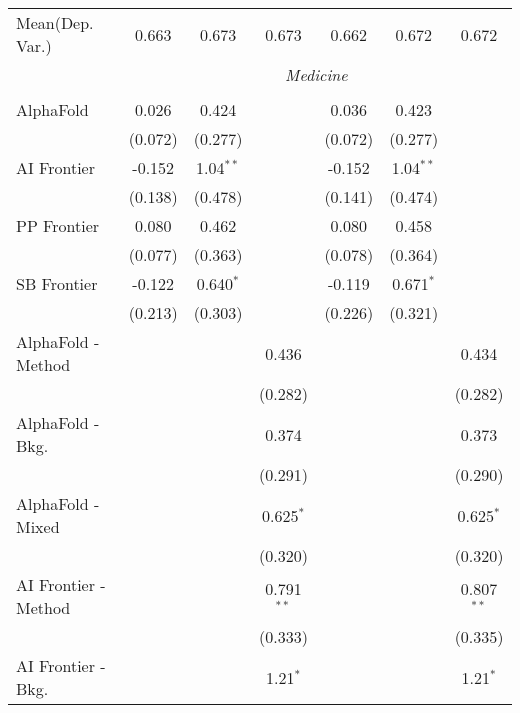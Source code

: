 \begin{tabular}{lcccccc}
Mean(Dep. Var.) & 0.663 & 0.673 & 0.673 & 0.662 & 0.672 & 0.672 \\
 & \multicolumn{6}{c}{\textit{Medicine}} \\ \\
   AlphaFold            & 0.026   & 0.424       &              & 0.036   & 0.423       &   \\   
                        & (0.072) & (0.277)     &              & (0.072) & (0.277)     &   \\   
   AI Frontier          & -0.152  & 1.04$^{**}$ &              & -0.152  & 1.04$^{**}$ &   \\   
                        & (0.138) & (0.478)     &              & (0.141) & (0.474)     &   \\   
   PP Frontier          & 0.080   & 0.462       &              & 0.080   & 0.458       &   \\   
                        & (0.077) & (0.363)     &              & (0.078) & (0.364)     &   \\   
   SB Frontier          & -0.122  & 0.640$^{*}$ &              & -0.119  & 0.671$^{*}$ &   \\   
                        & (0.213) & (0.303)     &              & (0.226) & (0.321)     &   \\   
   AlphaFold - Method   &         &             & 0.436        &         &             & 0.434\\   
                        &         &             & (0.282)      &         &             & (0.282)\\   
   AlphaFold - Bkg.     &         &             & 0.374        &         &             & 0.373\\   
                        &         &             & (0.291)      &         &             & (0.290)\\   
   AlphaFold - Mixed    &         &             & 0.625$^{*}$  &         &             & 0.625$^{*}$\\   
                        &         &             & (0.320)      &         &             & (0.320)\\   
   AI Frontier - Method &         &             & 0.791$^{**}$ &         &             & 0.807$^{**}$\\   
                        &         &             & (0.333)      &         &             & (0.335)\\   
   AI Frontier - Bkg.   &         &             & 1.21$^{*}$   &         &             & 1.21$^{*}$\\   

\end{tabular}
